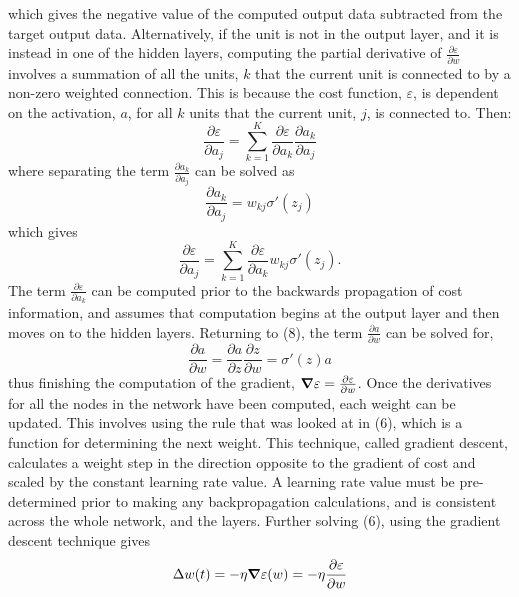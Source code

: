 \documentclass[twocolumn]{article}
\begin{document}
which gives the negative value of the computed output data subtracted from the target output data. Alternatively, if the unit is not in the output layer, and it is instead in one of the hidden layers, computing the partial derivative of $\frac{\partial \varepsilon }{\partial w}$ involves a summation of all the units, $k$ that the current unit is connected to by a non-zero weighted connection. This is because the cost function, $\varepsilon$, is dependent on the activation, $a$, for all $k$ units that the current unit, $j$, is connected to. Then:
\begin{equation}
        \frac{\partial \varepsilon }{\partial a_{j}} = \sum_{k=1}^{K} \frac{\partial \varepsilon}{\partial a_{k}}\frac{\partial a_{k}  }{\partial a_{j}} 
\end{equation}
where separating the term $\frac{\partial a_{k}  }{\partial a_{j}} $ can be solved as
\begin{equation}
        \frac{\partial a_{k} }{\partial a_{j}} = w_{kj}\sigma'(z_{j})
\end{equation}
which gives 
\begin{equation}
    \frac{\partial \varepsilon }{\partial a_{j}} = \sum_{k=1}^{K} \frac{\partial \varepsilon}{\partial a_{k}} w_{kj}\sigma'(z_{j}).
\end{equation}
The term $\frac{\partial \varepsilon}{\partial a_{k}}$ can be computed prior to the backwards propagation of cost information, and assumes that computation begins at the output layer and then moves on to the hidden layers. \cite{reid} Returning to (8), the term $\frac{\partial a}{\partial w}$ can be solved for, 
\begin{equation}
    \frac{\partial a}{\partial w} = \frac{\partial a}{\partial z} \frac{\partial z}{\partial w} = \sigma'(z)a
\end{equation}
thus finishing the computation of the gradient, $\grad \varepsilon = \frac{\partial \varepsilon}{\partial w}$. \cite{reid} Once  the derivatives for all the nodes in the network have been computed, each weight can be updated. This involves using the rule that was looked at in (6), which is a function for determining the next weight. This technique, called gradient descent, calculates a weight step in the direction opposite to the gradient of cost and scaled by the constant learning rate value. A learning rate value must be pre-determined prior to making any backpropagation calculations, and is consistent across the whole network, and the layers. Further solving (6), using the gradient descent technique gives
\begin{equation}
    \Delta w(t) = - \eta \grad \varepsilon(w) = - \eta \frac{\partial \varepsilon}{\partial w}
\end{equation}
\end{document}
